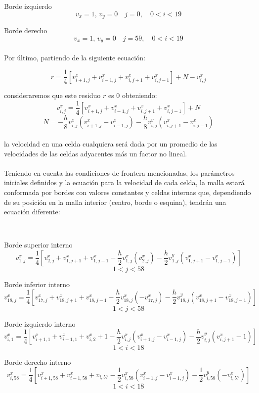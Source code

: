 \documentclass{article}
\begin{document}
  Borde izquierdo
  \[v_x = 1, \, v_y = 0 \quad j = 0, \quad 0 < i < 19\]

  Borde derecho
  \[v_x = 1, \, v_y = 0 \quad j = 59, \quad 0 < i < 19\]

  \paragraph{}
  Por último, partiendo de la siguiente ecuación:

  \[r=\frac{1}{4}[v_{i+1,j}^x+v_{i-1,j}^x+v_{i,j+1}^x+v_{i,j-1}^x]+N-v_{i,j}^x\]
  
  consideraremos que este residuo $r$ es $0$ obteniendo:
  \[v_{i,j}^x=\frac{1}{4}[v_{i+1,j}^x+v_{i-1,j}^x+v_{i,j+1}^x+v_{i,j-1}^x]+N\]
  \[N=-\frac{h}{8}v_{i,j}^x(v_{i+1,j}^x-v_{i-1,j}^x)-\frac{h}{8}v_{i,j}^y(v_{i,j+1}^x-v_{i,j-1}^x)\]

  \paragraph{}
  la velocidad en una celda cualquiera será dada por un promedio de las velocidades de las celdas adyacentes más un factor no lineal.

  \paragraph{}
  Teniendo en cuenta las condiciones de frontera mencionadas, los parámetros iniciales definidos y la ecuación para la velocidad de cada celda, la malla estará conformada por bordes con valores constantes y celdas internas que, dependiendo de su posición en la malla interior (centro, borde o esquina), tendrán una ecuación diferente:

  \

  Borde superior interno
  \[v^{x}_{1,j} = \frac{1}{4}[v^x_{2,j} + v^x_{1,j+1} + v^x_{1,j-1} - \frac{h}{2}v^{x}_{1,j}(v^x_{2,j})- \frac{h}{2}v^{y}_{1,j}(v^x_{1,j+1}-v^x_{1,j-1})]\]
  \[1<j<58\]

  Borde inferior interno
  \[v^{x}_{18,j} = \frac{1}{4}[v^x_{17,j} + v^x_{18,j+1} + v^x_{18,j-1} - \frac{h}{2}v^{x}_{18,j}(-v^{x}_{17,j})- \frac{h}{2}v^{y}_{18,j}(v^x_{18,j+1}-v^x_{18,j-1})]\]
  \[1<j<58\]

  Borde izquierdo interno
  \[v_{i,1}^x=\frac{1}{4}[v_{i+1,1}^x+v_{i-1,1}^x+v_{i,2}^x+1 - \frac{h}{2}v^{x}_{i,j}(v^{x}_{i+1,j}-v^{x}_{i-1,j})- \frac{h}{2}v^{y}_{i,j}(v^x_{i,j+1}-1)]\]
  \[1<i<18\]

  Borde derecho interno
  \[v_{i,58}^x=\frac{1}{4}[v_{i+1,58}^x+v_{i-1,58}^x+v_{i,57}-\frac{1}{2}v_{i,58}^x(v_{i+1,j}^x-v_{i-1,j}^x)-\frac{1}{2}v_{i,58}^y(-v_{i,57}^x)]\]
  \[1<i<18\]
\end{document}
